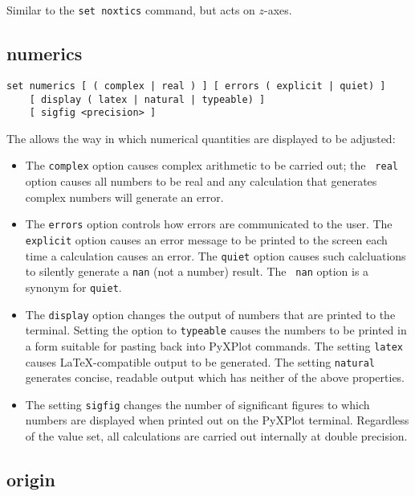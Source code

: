 Similar to the {\tt set noxtics} command, but acts on $z$-axes.


\subsection{numerics}

\begin{verbatim}
set numerics [ ( complex | real ) ] [ errors ( explicit | quiet) ]
    [ display ( latex | natural | typeable) ]
    [ sigfig <precision> ]
\end{verbatim}

The  allows the way in which numerical quantities are displayed to be adjusted:

\begin{itemize}

\item The {\tt complex} option causes complex arithmetic to be carried out; the {\tt
real} option causes all numbers to be real and any calculation that generates
complex numbers will generate an error.

\item The {\tt errors} option controls how errors are communicated to the user.  The
{\tt explicit} option causes an error message to be printed to the screen each
time a calculation causes an error.  The {\tt quiet} option causes such
calcluations to silently generate a {\tt nan} (not a number) result.  The {\tt
nan} option is a synonym for {\tt quiet}.

\item The {\tt display} option changes the output of numbers that are printed to the
terminal.  Setting the option to {\tt typeable} causes the numbers to be printed
in a form suitable for pasting back into PyXPlot commands.  The setting {\tt latex}
causes \LaTeX-compatible output to be generated.  The setting {\tt natural}
generates concise, readable output which has neither of the above properties.

\item The setting {\tt sigfig} changes the number of significant figures to which
numbers are displayed when printed out on the PyXPlot terminal.  Regardless of
the value set, all calculations are carried out internally at double precision.

\end{itemize}


\subsection{origin}

